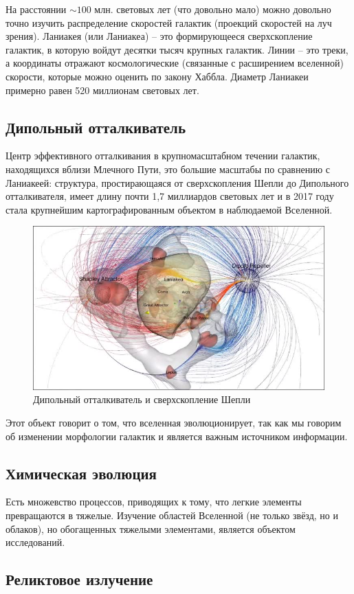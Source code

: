 На расстоянии $\sim 100$ млн. световых лет (что довольно мало) можно довольно точно изучить распределение скоростей галактик (проекций скоростей на луч зрения). Ланиакея (или Ланиакеа) -- это формирующееся сверхскопление галактик, в которую войдут десятки тысяч крупных галактик. Линии -- это треки, а координаты отражают космологические (связанные с расширением вселенной) скорости, которые можно оценить по закону Хаббла. Диаметр Ланиакеи примерно равен 520 миллионам световых лет.

\subsection{Дипольный отталкиватель}
Центр эффективного отталкивания в крупномасштабном течении галактик, находящихся вблизи Млечного Пути, это большие масштабы по сравнению с Ланиакеей: структура, простирающаяся от сверхскопления Шепли до Дипольного отталкивателя, имеет длину почти 1,7 миллиардов световых лет и в 2017 году стала крупнейшим картографированным объектом в наблюдаемой Вселенной. 
\begin{figure}[h]
  \centering
    \includegraphics[width=0.7\linewidth]{Pictures/19_dip.jpg}
  \caption{Дипольный отталкиватель и сверхскопление Шепли}
  \label{fig:19_dip}
 \end{figure}
 Этот объект говорит о том, что вселенная эволюционирует, так как мы говорим об изменении морфологии галактик и является важным источником информации.
 
 \subsection{Химическая эволюция}
 
 Есть множевство процессов, приводящих к тому, что легкие элементы превращаются в тяжелые. Изучение областей Вселенной (не только звёзд, но и облаков), но обогащенных тяжелыми элементами, является объектом исследований.
 
 \subsection{Реликтовое излучение}
 
